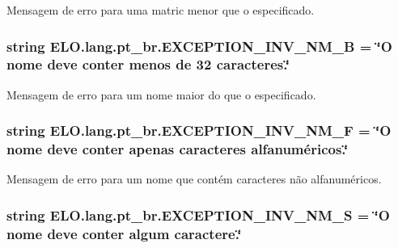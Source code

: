 Mensagem de erro para uma matric menor que o especificado. 

\hypertarget{namespaceELO_1_1lang_1_1pt__br_ae835fd7dd58a6cda2019cccefa9e83f0}{
\subsubsection[{E\-X\-C\-E\-P\-T\-I\-O\-N\-\_\-\-I\-N\-V\-\_\-\-N\-M\-\_\-\-B}]{\setlength{\rightskip}{0pt plus 5cm}string E\-L\-O.\-lang.\-pt\-\_\-br.\-E\-X\-C\-E\-P\-T\-I\-O\-N\-\_\-\-I\-N\-V\-\_\-\-N\-M\-\_\-\-B = \char`\"{}O nome deve conter menos de 32 caracteres.\char`\"{}}}\label{d5/d70/namespaceELO_1_1lang_1_1pt__br_ae835fd7dd58a6cda2019cccefa9e83f0}


Mensagem de erro para um nome maior do que o especificado. 

\hypertarget{namespaceELO_1_1lang_1_1pt__br_a72ba2c52ef08e79f9edbea870bed1a83}{
\subsubsection[{E\-X\-C\-E\-P\-T\-I\-O\-N\-\_\-\-I\-N\-V\-\_\-\-N\-M\-\_\-\-F}]{\setlength{\rightskip}{0pt plus 5cm}string E\-L\-O.\-lang.\-pt\-\_\-br.\-E\-X\-C\-E\-P\-T\-I\-O\-N\-\_\-\-I\-N\-V\-\_\-\-N\-M\-\_\-\-F = \char`\"{}O nome deve conter apenas caracteres alfanuméricos.\char`\"{}}}\label{d5/d70/namespaceELO_1_1lang_1_1pt__br_a72ba2c52ef08e79f9edbea870bed1a83}


Mensagem de erro para um nome que contém caracteres não alfanuméricos. 

\hypertarget{namespaceELO_1_1lang_1_1pt__br_aeec5602b588bc7ff8c48415da9631c67}{
\subsubsection[{E\-X\-C\-E\-P\-T\-I\-O\-N\-\_\-\-I\-N\-V\-\_\-\-N\-M\-\_\-\-S}]{\setlength{\rightskip}{0pt plus 5cm}string E\-L\-O.\-lang.\-pt\-\_\-br.\-E\-X\-C\-E\-P\-T\-I\-O\-N\-\_\-\-I\-N\-V\-\_\-\-N\-M\-\_\-\-S = \char`\"{}O nome deve conter algum caractere.\char`\"{}}}\label{d5/d70/namespaceELO_1_1lang_1_1pt__br_aeec5602b588bc7ff8c48415da9631c67}


